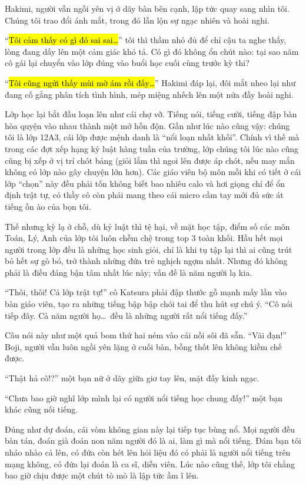 \documentclass[../main.tex]{subfiles}
\begin{document}
Hakimi, người vẫn ngồi yên vị ở dãy bàn bên cạnh, lập tức quay sang nhìn tôi. Chúng tôi trao đổi ánh mắt, trong đó lẫn lộn sự ngạc nhiên và hoài nghi.

``\hl{Tôi cảm thấy có gì đó sai sai\dots}'' tôi thì thầm nhỏ đủ để chỉ cậu ta nghe thấy, lòng đang dấy lên một cảm giác khó tả. Có gì đó không ổn chút nào: tại sao năm cô gái lại chuyển vào lớp đúng vào buổi học cuối cùng trước kỳ thi?

``\hl{Tôi cũng ngửi thấy mùi mờ ám rồi đấy\dots}'' Hakimi đáp lại, đôi mắt nheo lại như đang cố gắng phân tích tình hình, mép miệng nhếch lên một nửa đầy hoài nghi.

Lớp học lại bắt đầu loạn lên như cái chợ vỡ. Tiếng nói, tiếng cười, tiếng đập bàn hòa quyện vào nhau thành một mớ hỗn độn. Gần như lúc nào cũng vậy: chúng tôi là lớp 12A3, cái lớp được mệnh danh là ``nổi loạn nhất khối''. Chính vì thế mà trong các đợt xếp hạng kỷ luật hàng tuần của trường, lớp chúng tôi lúc nào cũng cũng bị xếp ở vị trí chót bảng (giỏi lắm thì ngoi lên được áp chót, nếu may mắn không có lớp nào gây chuyện lớn hơn). Các giáo viên bộ môn mỗi khi có tiết ở cái lớp ``chọn'' này đều phải tốn không biết bao nhiêu calo và hơi giọng chỉ để ổn định trật tự, có thầy cô còn phải mang theo cái micro cầm tay mới đủ sức át tiếng ồn ào của bọn tôi.

Thế nhưng kỳ lạ ở chỗ, dù kỷ luật thì tệ hại, về mặt học tập, điểm số các môn Toán, Lý, Anh của lớp tôi luôn chễm chệ trong top 3 toàn khối. Hầu hết mọi người trong lớp đều là những học sinh giỏi, chỉ là khi tụ tập lại thì ai cũng trút bỏ hết sự gò bó, trở thành những đứa trẻ nghịch ngợm nhất. Nhưng đó không phải là điều đáng bận tâm nhất lúc này; vấn đề là năm người lạ kia.

``Thôi, thôi! Cả lớp trật tự!'' cô Katsura phải đập thước gỗ mạnh mấy lần vào bàn giáo viên, tạo ra những tiếng bập bập chói tai để thu hút sự chú ý. ``Cô nói tiếp đây. Cả năm người họ\dots\ đều là những người rất nổi tiếng đấy.''

Câu nói này như một quả bom thứ hai ném vào cái nồi sôi đã sẵn. ``Vãi đạn!'' Boji, người vẫn luôn ngồi yên lặng ở cuối bàn, bỗng thốt lên không kiềm chế được.

``Thật hả cô!?'' một bạn nữ ở dãy giữa giơ tay lên, mặt đầy kinh ngạc.

``Chưa bao giờ nghĩ lớp mình lại có người nổi tiếng học chung đấy!'' một bạn khác cũng nối tiếng.

Đúng như dự đoán, cái vòm không gian này lại tiếp tục bùng nổ. Mọi người đều bàn tán, đoán già đoán non năm người đó là ai, làm gì mà nổi tiếng. Đám bạn tôi nháo nhào cả lên, có đứa còn hét lên hỏi liệu đó có phải là người nổi tiếng trên mạng không, có đứa lại đoán là ca sĩ, diễn viên. Lúc nào cũng thế, lớp tôi chẳng bao giờ chịu được một chút tò mò là lập tức ầm ĩ lên.
\end{document}
